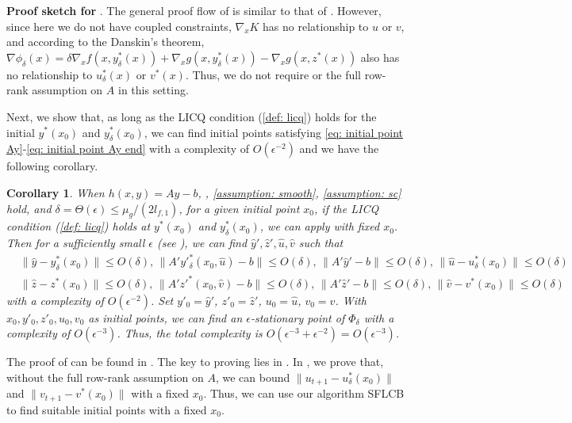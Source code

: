 \documentclass{article}
\theoremstyle{plain}
\newtheorem{corollary}[theorem]{Corollary}
\theoremstyle{definition}
\theoremstyle{remark}
\begin{document}
\textbf{Proof sketch for }. The general proof flow of   is similar to that of . However, since here we do not have coupled constraints, $\nabla_x K$ has no relationship to $u$ or $v$, and according to the Danskin's theorem, $\nabla \phi_\delta(x)=\delta \nabla_x f(x,y^*_\delta(x))+\nabla_x g(x,y^*_\delta(x))-\nabla_x g(x, z^*(x))$ also has no relationship to $u^*_\delta(x)$ or $v^*(x)$. Thus, we do not require  or the full row-rank assumption on $A$ in this setting.

Next, we show that, as long as the LICQ condition (\cref{def: licq}) holds for the initial $y^*(x_0)$ and $y^*_\delta(x_0)$, we can find initial points satisfying \eqref{eq: initial point Ay}-\eqref{eq: initial point Ay end} with a complexity of $O(\epsilon^{-2})$ and we have the following corollary.

\begin{corollary}\label{coro: Ay}
When $h(x,y)=Ay-b$, , \ref{assumption: smooth}, \ref{assumption: sc} hold, and $\delta=\Theta(\epsilon)\leq \mu_g/(2l_{f,1})$, for a given initial point $x_0$, if the LICQ  condition (\cref{def: licq}) holds at $y^*(x_0)$ and $y^*_\delta(x_0)$, we can apply  with fixed $x_0$. Then for a sufficiently small $\epsilon$ (see ), we can find $\hat y', \hat z', \hat u, \hat v$ such that
    \begin{align*}
        &\|\hat y-y^*_\delta(x_0)\|\leq O(\delta), \,\|A'y'^*_\delta(x_0,\hat u)-b\|\leq O(\delta), \, \|A'\hat y'-b\|\leq O(\delta), \,\|\hat u-u^*_\delta(x_0)\|\leq O(\delta)\\ &\|\hat z-z^*(x_0)\|\leq O(\delta), \,\|A'z'^*(x_0,\hat v)-b\|\leq O(\delta), \,\|A'\hat z'-b\|\leq O(\delta), \,\|\hat v-v^*(x_0)\|\leq O(\delta)
    \end{align*}
with a complexity of $O(\epsilon^{-2})$. Set $y'_0=\hat y'$, $z'_0=\hat z'$, $u_0=\hat u$, $v_0=\hat v$. With $x_0, y'_0, z'_0, u_0, v_0$ as initial points, we can find an $\epsilon$-stationary point of $\Phi_\delta$
with a complexity of $O(\epsilon^{-3})$. Thus, the total complexity is $O(\epsilon^{-3}+\epsilon^{-2})=O(\epsilon^{-3})$.
\end{corollary}
The proof of  can be found in . 
The key to proving  lies in . In , we prove that, without the full row-rank assumption on $A$, we can bound $\|u_{t+1}-u^*_\delta(x_0)\|$ and $\|v_{t+1}-v^*(x_0)\|$ with a fixed $x_0$. Thus, we can use our algorithm SFLCB to find suitable initial points with a fixed $x_0$.
\end{document}
